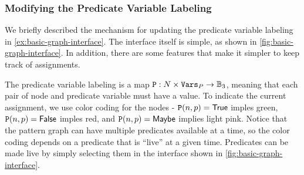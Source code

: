 \subsubsection{Modifying the Predicate Variable Labeling}
We briefly described the mechanism for updating the predicate variable labeling in \autoref{ex:basic-graph-interface}. The interface itself is simple, as shown in \autoref{fig:basic-graph-interface}. In addition, there are some features that make it simpler to keep track of assignments.

The predicate variable labeling is a map $\mathtt{P}: N \times \mathtt{Vars}_P \to \mathbb{B}_3$, meaning that each pair of node and predicate variable must have a value. To indicate the current assignment, we use color coding for the nodes - $\mathtt{P}(n, p) = \mathsf{True}$ imples green, $\mathtt{P}(n, p) = \mathsf{False}$ imples red, and $\mathtt{P}(n, p) = \mathsf{Maybe}$ implies light pink. Notice that the pattern graph can have multiple predicates available at a time, so the color coding depends on a predicate that is ``live'' at a given time. Predicates can be made live by simply selecting them in the interface shown in \autoref{fig:basic-graph-interface}.

